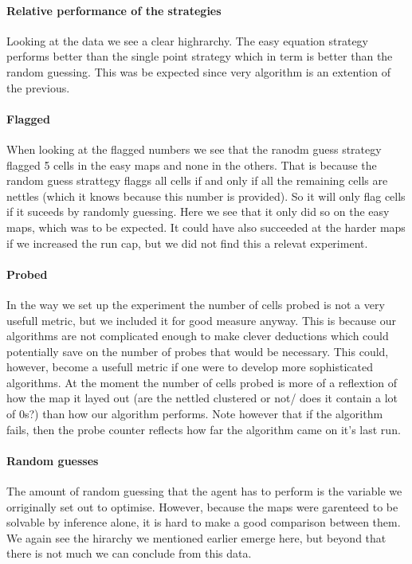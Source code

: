 \documentclass[british]{article}
\begin{document}
\paragraph{Relative performance of the strategies} Looking at the data we see a clear highrarchy. The easy equation strategy performs better than the single point strategy which in term is better than the random guessing. This was be expected since very algorithm is an extention of the previous.  

\paragraph{Flagged} When looking at the flagged numbers we see that the ranodm guess strategy flagged 5 cells in the easy maps and none in the others. That is because the random guess strattegy flaggs all cells if and only if all the remaining cells are nettles (which it knows because  this number is provided). So it will only flag cells if it suceeds by randomly guessing. Here we see that it only did so on the easy maps, which was to be expected. It could have also succeeded at the harder maps if we increased the run cap, but we did not find this a relevat experiment.

\paragraph{Probed} In the way we set up the experiment the number of cells probed is not a very usefull metric, but we included it for good measure anyway. This is because our algorithms are not complicated enough to make clever deductions which could potentially save on the number of probes that would be necessary. This could, however, become a usefull metric if one were to develop more sophisticated algorithms. At the moment the number of cells probed is more of a reflextion of how the map it layed out (are the nettled clustered or not/ does it contain a lot of 0s?) than how our algorithm performs. Note however that if the algorithm fails, then the probe counter reflects how far the algorithm came on it's last run. 

\paragraph{Random guesses} The amount of random guessing that the agent has to perform is the variable we orriginally set out to optimise. However, because the maps were garenteed to be solvable by inference alone, it is hard to make a good comparison between them. We again see the hirarchy we mentioned earlier emerge here, but beyond that there is not much we can conclude from this data. 
\end{document}
